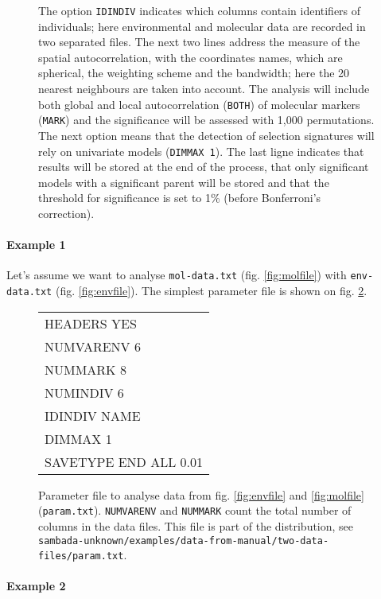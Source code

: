 \documentclass[a4paper,11pt]{article}
\newcommand{\versionnumber}{unknown}
\newcommand{\pathtodatafrommanual}{\texttt{sambada-\versionnumber/examples/data-from-manual/}}
\newcommand{\pathtotwodatafiles}{\pathtodatafrommanual\texttt{two-data-files/}}
\begin{document}
\begin{figure}[htbp]
{The option \texttt{IDINDIV} indicates which columns contain identifiers of individuals; here environmental and molecular data are recorded in two separated files.
The next two lines address the measure of the spatial autocorrelation, with the coordinates names, which are spherical, the weighting scheme and the bandwidth; here the 20 nearest neighbours are taken into account.
The analysis will include both global and local autocorrelation (\texttt{BOTH}) of molecular markers (\texttt{MARK}) and the significance will be assessed with 1,000 permutations.
The next option means that the detection of selection signatures will rely on univariate models (\texttt{DIMMAX 1}).
The last ligne indicates that results will be stored at the end of the process, that only significant models with a significant parent will be stored and that the threshold for significance is set to 1\% (before Bonferroni's correction).
}
\label{fig:fichier-param-general}
\end{figure}

\paragraph{Example 1} 
Let's assume we want to analyse \verb+mol-data.txt+ (fig. \ref{fig:molfile}) with \verb+env-data.txt+ (fig. \ref{fig:envfile}).
The simplest parameter file is shown on fig. \ref{fig:fichier-param}.

\begin{figure}[htbp]
\centering
\ttfamily
\begin{tabular}{|l|}
\hline
HEADERS YES\\	
NUMVARENV 6\\	
NUMMARK 8	\\
NUMINDIV 6\\
IDINDIV NAME\\
DIMMAX 1\\
SAVETYPE END ALL 0.01\\
\hline
\end{tabular}%
\caption{Parameter file to analyse data from fig. \ref{fig:envfile} and \ref{fig:molfile} (\texttt{param.txt}). 
\texttt{NUMVARENV} and \texttt{NUMMARK} count the total number of columns in the data files.
This file is part of the distribution, see \pathtotwodatafiles\texttt{param.txt}.
}
\label{fig:fichier-param}
\end{figure}


\paragraph{Example 2} 
\end{document}
